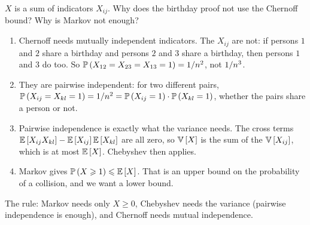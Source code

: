 \begin{exercisebox}
\begin{pproblem}\label{pp:why-cheb}
    $X$ is a sum of indicators $X_{ij}$. Why does the birthday proof not use the Chernoff bound?
    Why is Markov not enough?
\end{pproblem}
\tcblower
\begin{wsolution}
    \leavevmode
    \begin{enumerate}
        \item Chernoff needs mutually independent indicators. The $X_{ij}$ are not: if persons $1$
              and $2$ share a birthday and persons $2$ and $3$ share a birthday, then persons $1$
              and $3$ do too. So $\operatorname{\mathbb{P}}\left(X_{12} = X_{23} = X_{13} = 1\right) = 1/n^2$, not
              $1/n^3$.
        \item They are pairwise independent: for two different pairs,
              $\operatorname{\mathbb{P}}\left(X_{ij} = X_{kl} = 1\right) = 1/n^2 = \operatorname{\mathbb{P}}\left(X_{ij} = 1\right) \cdot \operatorname{\mathbb{P}}\left(X_{kl} = 1\right)$,
              whether the pairs share a person or not.
        \item Pairwise independence is exactly what the variance needs. The cross terms
              $\operatorname{\mathbb{E}}\left[X_{ij} X_{kl}\right] - \operatorname{\mathbb{E}}\left[X_{ij}\right]\operatorname{\mathbb{E}}\left[X_{kl}\right]$ are all zero,
              so $\operatorname{\mathbb{V}}\left[X\right]$ is the sum of the $\operatorname{\mathbb{V}}\left[X_{ij}\right]$, which is at most
              $\operatorname{\mathbb{E}}\left[X\right]$. Chebyshev then applies.
        \item Markov gives $\operatorname{\mathbb{P}}\left(X \geqslant 1\right) \leqslant \operatorname{\mathbb{E}}\left[X\right]$. That is an upper bound on the
              probability of a collision, and we want a lower bound.
    \end{enumerate}
    The rule: Markov needs only $X \geq 0$, Chebyshev needs the variance (pairwise independence is
    enough), and Chernoff needs mutual independence.
\end{wsolution}
\end{exercisebox}

